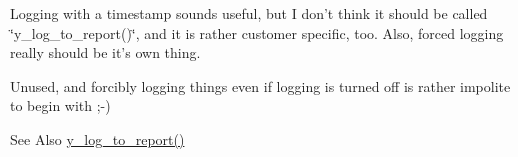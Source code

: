 \begin{DoxyRefList}
\item[\label{deprecated__deprecated000011}%
\hypertarget{deprecated__deprecated000011}{}%
Member \hyperlink{y__logging_8c_a440898bcda285688344b7147e26ff5b7}{y\-\_\-log\-\_\-to\-\_\-report} (char $\ast$message)]Logging with a timestamp sounds useful, but I don't think it should be called \char`\"{}y\-\_\-log\-\_\-to\-\_\-report()\char`\"{}, and it is rather customer specific, too. Also, forced logging really should be it's own thing. 
\item[\label{deprecated__deprecated000013}%
\hypertarget{deprecated__deprecated000013}{}%
Member \hyperlink{y__logging_8c_ace528d55b1ad1149709aaaadb00730ae}{y\-\_\-log\-\_\-warning} (char $\ast$message)]Unused, and forcibly logging things even if logging is turned off is rather impolite to begin with ;-\/) \begin{DoxySeeAlso}{See Also}
\hyperlink{y__logging_8c_a440898bcda285688344b7147e26ff5b7}{y\-\_\-log\-\_\-to\-\_\-report()}  
\end{DoxySeeAlso}


\end{DoxyRefList}
